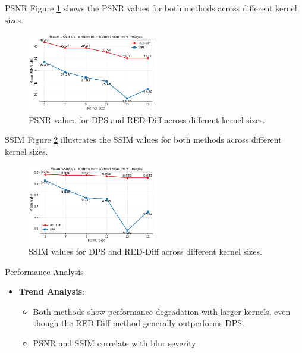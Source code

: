 \begin{frame}{PSNR}
    Figure \ref{fig:psnr_results} shows the PSNR values for both methods across different kernel sizes.
    \begin{figure}
        \centering
        \includegraphics[width=0.5\textwidth]{media/mean_psnr_over_kernels.png}
        \caption{PSNR values for DPS and RED-Diff across different kernel sizes.}
        \label{fig:psnr_results}
    \end{figure}
\end{frame}

\begin{frame}{SSIM}
    Figure \ref{fig:ssim_results} illustrates the SSIM values for both methods across different kernel sizes.
    \begin{figure}
        \centering
        \includegraphics[width=0.5\textwidth]{media/mean_ssim_over_kernels.png}
        \caption{SSIM values for DPS and RED-Diff across different kernel sizes.}
        \label{fig:ssim_results}
    \end{figure}
\end{frame}

\begin{frame}{Performance Analysis}
    \begin{itemize}
        \item \textbf{Trend Analysis}:
              \begin{itemize}
                  \item Both methods show performance degradation with larger kernels, even though the RED-Diff method generally outperforms DPS.
                  \item PSNR and SSIM correlate with blur severity
              \end{itemize}
    \end{itemize}
\end{frame}

